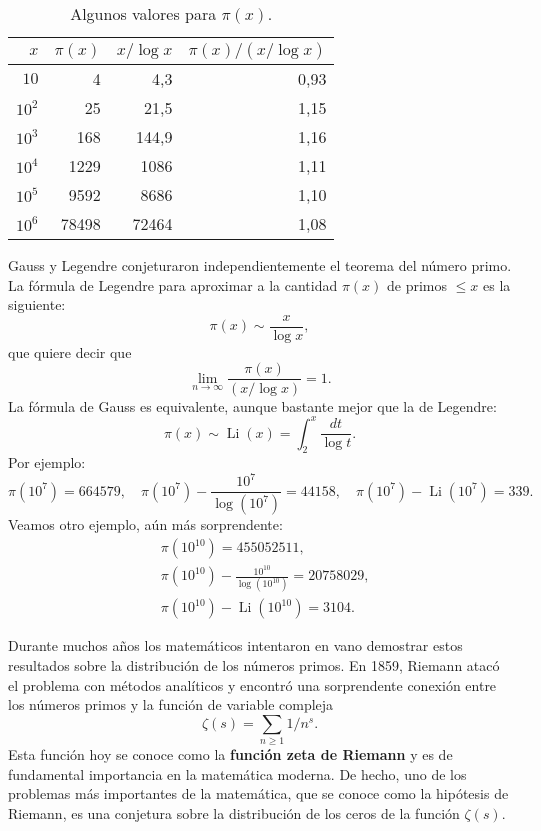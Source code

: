 \begin{table}[h!]
  \begin{center}
    \caption{Algunos valores para $\pi(x)$.}
    \label{tab:pi}
    \begin{tabular}{r|r|r|r} 
	  \hline
	  $x$ & $\pi(x)$ & $x/\log x$ & $\pi(x)/(x/\log x)$\\
      \hline
	  $10$ & 4 & 4,3 & 0,93\\
	  $10^2$ & 25 & 21,5 & 1,15\\
	  $10^3$ & 168 & 144,9 & 1,16\\
	  $10^4$ & 1229 & 1086 & 1,11\\
	  $10^5$ & 9592 & 8686 & 1,10\\
	  $10^6$ & 78498& 72464 & 1,08\\
	  \hline
    \end{tabular}
  \end{center}
\end{table}

Gauss y Legendre conjeturaron independientemente el teorema del número primo.
La fórmula de Legendre para aproximar a la cantidad $\pi(x)$ de primos $\leq x$
es la siguiente:
\[
	\pi(x)\sim \frac{x}{\log x},
\]
que quiere decir que 
\[
	\lim_{n\to\infty} \frac{\pi(x)}{(x/\log x)}=1.
\]
La fórmula de Gauss es equivalente, aunque bastante mejor que la de Legendre: 
\[
	\pi(x)\sim\operatorname{Li}(x)=\int_2^x\frac{dt}{\log t}.
\]
Por ejemplo:
\[
	\pi(10^7)=664579,\quad
	\pi(10^7)-\frac{10^7}{\log(10^7)}=44158,\quad
	\pi(10^7)-\operatorname{Li}(10^7)=339.
\]
Veamos otro ejemplo, aún más sorprendente: 
\begin{align*}
	&\pi(10^{10})=455052511,\\
	&\pi(10^{10})-\frac{10^{10}}{\log (10^{10})}=20758029,\\
	&\pi(10^{10})-\operatorname{Li}(10^{10})=3104.
\end{align*}


Durante muchos años los matemáticos intentaron en vano demostrar estos
resultados sobre la distribución de los números primos.  En 1859, Riemann atacó
el problema con métodos analíticos y encontró una sorprendente conexión entre
los números primos y la función de variable compleja 
\[
\zeta(s)=\sum_{n\geq1}1/n^{s}. 
\]
Esta función hoy se conoce como la \textbf{función zeta de Riemann} y es de
fundamental importancia en la matemática moderna. De hecho, uno de los
problemas más importantes de la matemática, que se conoce como la hipótesis de
Riemann, es una conjetura sobre la distribución de los ceros de la función
$\zeta(s)$. 

